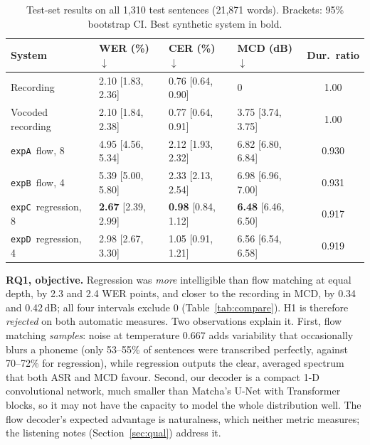 \documentclass[11pt,a4paper]{article}
\newcommand{\expA}{\texttt{expA}}
\newcommand{\expB}{\texttt{expB}}
\newcommand{\expC}{\texttt{expC}}
\newcommand{\expD}{\texttt{expD}}
\newcommand{\ci}[2]{{\scriptsize[#1, #2]}}
\begin{document}
\begin{table}[H]
\centering\small
\caption{Test-set results on all 1{,}310 test sentences (21{,}871 words). Brackets: 95\% bootstrap CI. Best synthetic system in bold.}
\label{tab:results}
\begin{tabular}{@{}llllc@{}}
\toprule
System & WER (\%) $\downarrow$ & CER (\%) $\downarrow$ & MCD (dB) $\downarrow$ & Dur.\ ratio \\ \midrule
Recording & 2.10 \ci{1.83}{2.36} & 0.76 \ci{0.64}{0.90} & 0 & 1.00 \\
Vocoded recording & 2.10 \ci{1.84}{2.38} & 0.77 \ci{0.64}{0.91} & 3.75 \ci{3.74}{3.75} & 1.00 \\ \midrule
\expA\ flow, 8 & 4.95 \ci{4.56}{5.34} & 2.12 \ci{1.93}{2.32} & 6.82 \ci{6.80}{6.84} & 0.930 \\
\expB\ flow, 4 & 5.39 \ci{5.00}{5.80} & 2.33 \ci{2.13}{2.54} & 6.98 \ci{6.96}{7.00} & 0.931 \\
\expC\ regression, 8 & \textbf{2.67} \ci{2.39}{2.99} & \textbf{0.98} \ci{0.84}{1.12} & \textbf{6.48} \ci{6.46}{6.50} & 0.917 \\
\expD\ regression, 4 & 2.98 \ci{2.67}{3.30} & 1.05 \ci{0.91}{1.21} & 6.56 \ci{6.54}{6.58} & 0.919 \\ \bottomrule
\end{tabular}
\end{table}

\noindent\textbf{RQ1, objective.} Regression was \emph{more} intelligible than flow matching at equal depth, by 2.3 and 2.4 WER points, and closer to the recording in MCD, by 0.34 and 0.42\,dB; all four intervals exclude 0 (Table~\ref{tab:compare}). H1 is therefore \emph{rejected} on both automatic measures. Two observations explain it. First, flow matching \emph{samples}: noise at temperature 0.667 adds variability that occasionally blurs a phoneme (only 53--55\% of sentences were transcribed perfectly, against 70--72\% for regression), while regression outputs the clear, averaged spectrum that both ASR and MCD favour. Second, our decoder is a compact 1-D convolutional network, much smaller than Matcha's U-Net with Transformer blocks, so it may not have the capacity to model the whole distribution well. The flow decoder's expected advantage is naturalness, which neither metric measures; the listening notes (Section~\ref{sec:qual}) address it.
\end{document}
